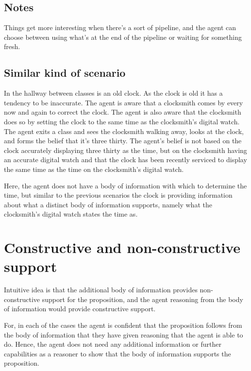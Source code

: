 \documentclass[10pt]{article}
\begin{document}
\subsection{Notes}
\label{sec:notes}

\begin{note}
  Things get more interesting when there's a sort of pipeline, and the agent can choose between using what's at the end of the pipeline or waiting for something fresh.
\end{note}

\subsection{Similar kind of scenario}
\label{sec:simil-kind-scen}

\begin{scenario}[Clocksmith]
  In the hallway between classes is an old clock.
  As the clock is old it has a tendency to be inaccurate.
  The agent is aware that a clocksmith comes by every now and again to correct the clock.
  The agent is also aware that the clocksmith does so by setting the clock to the same time as the clocksmith's digital watch.
  The agent exits a class and sees the clocksmith walking away, looks at the clock, and forms the belief that it's three thirty.
  The agent's belief is not based on the clock accurately displaying three thirty as the time, but on the clocksmith having an accurate digital watch and that the clock has been recently serviced to display the same time as the time on the clocksmith's digital watch.
\end{scenario}

Here, the agent does not have a body of information with which to determine the time, but similar to the previous scenarios the clock is providing information about what a distinct body of information supports, namely what the clocksmith's digital watch states the time as.

\section{Constructive and non-constructive support}
\label{sec:constr-non-constr}

Intuitive idea is that the additional body of information provides non-constructive support for the proposition, and the agent reasoning from the body of information would provide constructive support.

For, in each of the cases the agent is confident that the proposition follows from the body of information that they have given reasoning that the agent is able to do.
Hence, the agent does not need any additional information or further capabilities as a reasoner to show that the body of information supports the proposition.
\end{document}
